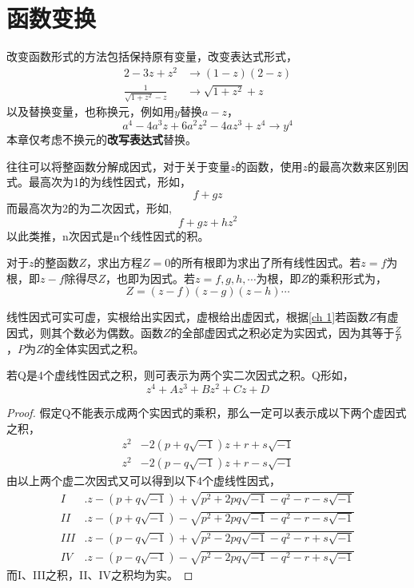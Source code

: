 \chapter{函数变换}\label{ch 2}
\begin{note}
改变函数形式的方法包括保持原有变量，改变表达式形式，
\begin{align*}
    2 - 3z + z^2 &\rightarrow (1-z)(2-z)\\
    \frac{1}{\sqrt{1 + z^2} - z} &\rightarrow \sqrt{1 + z^2} + z
\end{align*}
以及替换变量，也称换元，例如用$y$替换$a-z$，$$a^4 - 4a^3z + 6a^2z^2 - 4az^3 + z^4 \rightarrow y^4$$
本章仅考虑不换元的\textbf{改写表达式}替换。

往往可以将整函数分解成因式，对于关于变量$z$的函数，使用$z$的最高次数来区别因式。最高次为1的为线性因式，形如，
$$f + gz$$
而最高次为2的为二次因式，形如,
$$f + gz + hz^2$$
以此类推，n次因式是n个线性因式的积。

对于$z$的整函数$Z$，求出方程$Z=0$的所有根即为求出了所有线性因式。若$z=f$为根，即$z-f$除得尽$Z$，也即为因式。若$z = f,g,h,\cdots$为根，即$Z$的乘积形式为，
$$Z = (z-f)(z-g)(z-h)\cdots$$

线性因式可实可虚，实根给出实因式，虚根给出虚因式，根据\autoref{ch 1}若函数$Z$有虚因式，则其个数必为偶数。函数$Z$的全部虚因式之积必定为实因式，因为其等于$\frac{Z}{P}$，$P$为$Z$的全体实因式之积。

若Q是4个虚线性因式之积，则可表示为两个实二次因式之积。Q形如，
$$z^4 + Az^3 + Bz^2 + Cz + D$$

\begin{proof}
假定Q不能表示成两个实因式的乘积，那么一定可以表示成以下两个虚因式之积，
\begin{align*}
    z^2 &- 2(p + q \sqrt{-1})z + r + s\sqrt{-1}\\
    z^2 &- 2(p - q \sqrt{-1})z + r - s\sqrt{-1}
\end{align*}
由以上两个虚二次因式又可以得到以下4个虚线性因式，
\begin{align*}
    I&.z - (p + q \sqrt{-1}) + \sqrt{p^2 + 2pq\sqrt{-1} - q^2 - r - s\sqrt{-1}}\\
    II&.z - (p + q \sqrt{-1}) - \sqrt{p^2 + 2pq\sqrt{-1} - q^2 - r - s\sqrt{-1}}\\
    III&.z - (p - q \sqrt{-1}) + \sqrt{p^2 - 2pq\sqrt{-1} - q^2 - r + s\sqrt{-1}}\\
    IV&.z - (p - q \sqrt{-1}) - \sqrt{p^2 - 2pq\sqrt{-1} - q^2 - r + s\sqrt{-1}}
\end{align*}
而I、III之积，II、IV之积均为实。
\end{proof}


\end{note}

